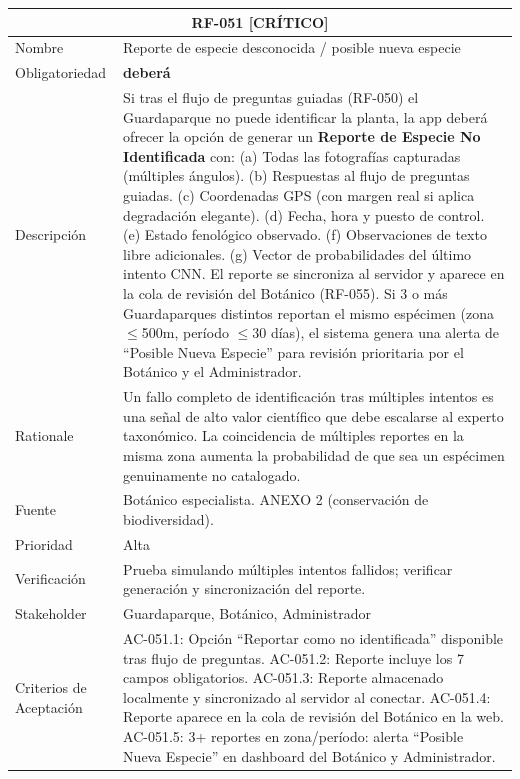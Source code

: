\documentclass[12pt, a4paper]{article}
\newcommand{\criticomark}{\textcolor{criticolor}{\textbf{[CR\'ITICO]}}}
\begin{document}
\begin{longtable}{|p{3cm}|p{11.5cm}|}
\hline
\multicolumn{2}{|c|}{\textbf{RF-051} \criticomark} \\
\hline
Nombre & Reporte de especie desconocida / posible nueva especie \\
\hline
Obligatoriedad & \textbf{deber\'a} \\
\hline
Descripci\'on & Si tras el flujo de preguntas guiadas (RF-050) el Guardaparque no puede identificar la planta, la app deber\'a ofrecer la opci\'on de generar un \textbf{Reporte de Especie No Identificada} con:\newline
(a) Todas las fotograf\'ias capturadas (m\'ultiples \'angulos).\newline
(b) Respuestas al flujo de preguntas guiadas.\newline
(c) Coordenadas GPS (con margen real si aplica degradaci\'on elegante).\newline
(d) Fecha, hora y puesto de control.\newline
(e) Estado fenol\'ogico observado.\newline
(f) Observaciones de texto libre adicionales.\newline
(g) Vector de probabilidades del \'ultimo intento CNN.\newline
El reporte se sincroniza al servidor y aparece en la cola de revisi\'on del Bot\'anico (RF-055). Si 3 o m\'as Guardaparques distintos reportan el mismo esp\'ecimen (zona $\leq$500m, per\'iodo $\leq$30 d\'ias), el sistema genera una alerta de ``Posible Nueva Especie'' para revisi\'on prioritaria por el Bot\'anico y el Administrador. \\
\hline
Rationale & Un fallo completo de identificaci\'on tras m\'ultiples intentos es una se\~nal de alto valor cient\'ifico que debe escalarse al experto taxon\'omico. La coincidencia de m\'ultiples reportes en la misma zona aumenta la probabilidad de que sea un esp\'ecimen genuinamente no catalogado. \\
\hline
Fuente & Bot\'anico especialista. ANEXO 2 (conservaci\'on de biodiversidad). \\
\hline
Prioridad & Alta \\
\hline
Verificaci\'on & Prueba simulando m\'ultiples intentos fallidos; verificar generaci\'on y sincronizaci\'on del reporte. \\
\hline
Stakeholder & Guardaparque, Bot\'anico, Administrador \\
\hline
Criterios de Aceptaci\'on &
AC-051.1: Opci\'on ``Reportar como no identificada'' disponible tras flujo de preguntas. \newline
AC-051.2: Reporte incluye los 7 campos obligatorios. \newline
AC-051.3: Reporte almacenado localmente y sincronizado al servidor al conectar. \newline
AC-051.4: Reporte aparece en la cola de revisi\'on del Bot\'anico en la web. \newline
AC-051.5: 3+ reportes en zona/per\'iodo: alerta ``Posible Nueva Especie'' en dashboard del Bot\'anico y Administrador. \\
\hline
\end{longtable}
\end{document}
